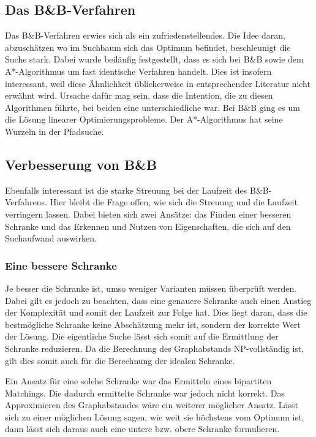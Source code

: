 \subsection{Das B\&B-Verfahren}
Das B\&B-Verfahren erwies sich als ein zufriedenstellendes. Die Idee daran, 
abzuschätzen wo im Suchbaum sich das Optimum befindet, beschleunigt die 
Suche stark. Dabei wurde beiläufig festgestellt, dass es sich bei B\&B sowie 
dem A*-Algorithmus um fast identische Verfahren handelt. Dies ist insofern 
interessant, weil diese Ähnlichkeit üblicherweise in entsprechender 
Literatur nicht erwähnt wird. Ursache dafür mag sein, dass die Intention, 
die zu diesen Algorithmen führte, bei beiden eine unterschiedliche war. 
Bei B\&B ging es um die Lösung linearer Optimierungsprobleme. Der 
A*-Algorithmus hat seine Wurzeln in der Pfadsuche.


\subsection{Verbesserung von B\&B}
Ebenfalls interessant ist die starke Streuung bei der Laufzeit des 
B\&B-Verfahrens. Hier bleibt die Frage offen, wie sich die Streuung und 
die Laufzeit verringern lassen. Dabei bieten sich zwei Ansätze: das 
Finden einer besseren Schranke und das Erkennen und Nutzen von 
Eigenschaften, die sich auf den Suchaufwand auswirken.


\subsubsection{Eine bessere Schranke}
Je besser die Schranke ist, umso weniger Varianten müssen überprüft 
werden. Dabei gilt es jedoch zu beachten, dass eine genauere Schranke 
auch einen Anstieg der Komplexität und somit der Laufzeit zur Folge hat. 
Dies liegt daran, dass die bestmögliche Schranke keine Abschätzung mehr 
ist, sondern der korrekte Wert der Lösung. Die eigentliche Suche lässt 
sich somit auf die Ermittlung der Schranke reduzieren. Da die Berechnung 
des Graphabstands NP-vollständig ist, gilt dies somit auch für die 
Berechnung der idealen Schranke.

Ein Ansatz für eine solche Schranke war das Ermitteln eines bipartiten 
Matchings. Die dadurch ermittelte Schranke war jedoch nicht korrekt. Das 
Approximieren des Graphabstandes wäre ein weiterer möglicher Ansatz. 
Lässt sich zu einer möglichen Lösung sagen, wie weit sie höchstens vom 
Optimum ist, dann lässt sich daraus auch eine untere bzw. obere Schranke 
formulieren.


